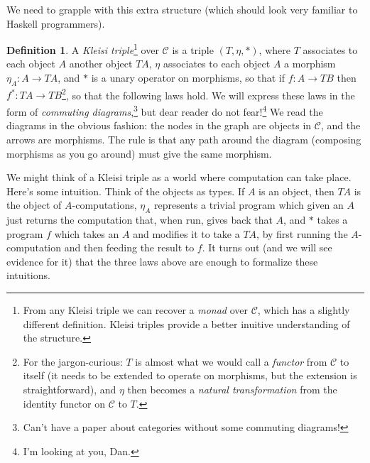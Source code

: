 \documentclass{article}
\renewcommand{\[}{\begin{eqnarray*}}
\renewcommand{\]}{\end{eqnarray*}}
\theoremstyle{definition}
\newtheorem*{defnnonum}{Definition}
\begin{document}
We need to grapple with this extra structure (which should look very familiar to
Haskell programmers).
\begin{defnnonum} A \emph{Kleisi triple}\footnote{From any Kleisi triple we can
  recover a \emph{monad} over $\mathcal C$, which has a slightly different
  definition. Kleisi triples provide a better inuitive understanding of the
structure.} over $\mathcal C$ is a triple
$(T,\eta,*)$, where $T$ associates to each object $A$ another object $TA$,
$\eta$ associates to each object $A$ a morphism $\eta_A : A \rightarrow TA$, and
$*$ is a unary operator on morphisms, so that if $f: A \rightarrow TB$ then
$f^*: TA \rightarrow TB$\footnote{For the jargon-curious: $T$ is almost what we
  would call a \emph{functor} from $\mathcal C$ to itself (it needs to be
  extended to operate on morphisms, but the extension is straightforward), and
  $\eta$ then becomes a \emph{natural transformation} from the identity functor
on $\mathcal C$ to $T$.}, so that the following laws hold. We will express these
laws in the form of \emph{commuting diagrams},\footnote{Can't have a paper about
categories without some commuting diagrams!} but dear reader do not
fear!\footnote{I'm looking at you, Dan.} We read the diagrams in the obvious
fashion: the nodes in the graph are objects in $\mathcal C$, and the arrows are
morphisms. The rule is that any path around the diagram (composing morphisms as
you go around) must give the same morphism.
\end{defnnonum}
We might think of a Kleisi triple as a world where computation can take place.
Here's some intuition. Think of the objects as types. If $A$ is an object, then
$TA$ is the object of $A$-computations, $\eta_A$ represents a trivial program
which given an $A$ just returns the computation that, when run, gives back that
$A$, and $*$ takes a program $f$ which takes an $A$ and modifies it to take a
$TA$, by first running the $A$-computation and then feeding the result to $f$.
It turns out (and we will see evidence for it) that the three laws above are
enough to formalize these intuitions.
\end{document}
